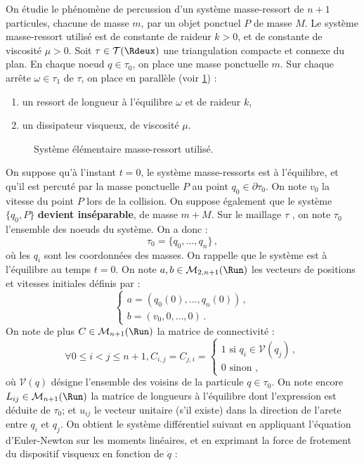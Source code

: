 On étudie le phénomène de percussion d’un système masse-ressort de $n + 1$ particules, chacune de masse $m$, par un objet ponctuel $P$ de masse $M$. Le système masse-ressort utilisé est de constante de raideur $k>0$, et de constante de viscosité $\mu>0$. Soit $\tau \in \mathcal{T} (\Rdeux)$ une triangulation compacte et connexe du plan. En chaque noeud $q \in \tau_0$, on place une masse ponctuelle $m$. Sur chaque arrête $\omega \in \tau_1$ de $\tau$, on place en parallèle (voir \cref{fig:masseressort}) :
\begin{enumerate}
    \item un ressort de longueur à l’équilibre $\omega$ et de raideur $k$,\
    \item un dissipateur visqueux, de viscosité $\mu$.
\end{enumerate}
\begin{figure}[!h]
    \centering
    \caption{Système élémentaire masse-ressort utilisé.}
    \label{fig:masseressort}
\end{figure}
On suppose qu’à l’instant $t = 0$, le système masse-ressorts est à l’équilibre, et qu’il est percuté par la masse ponctuelle $P$ au point $q_0 \in \partial\tau_0$. On note $v_0$ la vitesse du point $P$ lors de la collision. On suppose également que le système $\{q_0, P\}$ \textbf{devient inséparable}, de masse $m + M$.
Sur le maillage $\tau$ , on note $\tau_0$ l’ensemble des noeuds du système. On a donc :
$$\tau_0 = \{q_0, . . . , q_n \} \,,$$ où les $q_i$ sont les coordonnées des masses. On rappelle que le système est à l’équilibre au temps $t = 0$. On note $a, b \in \mathcal{M}_{2,n+1} (\Run)$ les vecteurs de positions et vitesses initiales définis
par :
$$
\begin{cases}
    a = (q_0(0), \ldots, q_n(0)) \,, \\
    b = (v_0,0,\ldots,0) \,.
\end{cases}
$$
On note de plus $C \in \mathcal{M}_{n+1}(\Run)$ la matrice de connectivité :
$$
∀0 \leq i < j \leq n + 1, C_{i,j} = C_{j,i} =
\begin{cases}
    1 \text{ si } q_i \in \mathcal{V}(q_j) \,, \\
    0 \text{ sinon },
\end{cases}
$$
où $\mathcal{V}(q)$ désigne l’ensemble des voisins de la particule $q \in \tau_0$. On note encore $L_{ij} \in \mathcal{M}_{n+1} (\Run)$ la matrice de longueurs à l’équilibre dont l’expression est déduite de $τ_0$; et $u_{ij}$ le vecteur unitaire (s'il existe) dans la direction de l'arete entre $q_i$ et $q_j$. On obtient le système différentiel suivant en appliquant l'équation d'Euler-Newton sur les moments linéaires, et en exprimant la force de frotement du dispositif visqueux en fonction de $\dot q$ :
